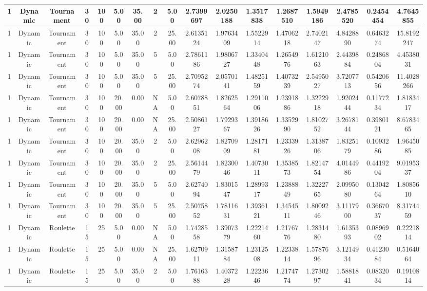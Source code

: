 \begin{longtable}{ | c | c | c | c | c | c | c | c | c | c | c | c | c | c | c | c | c | }
	\hline
	1	&	Dynamic	&	Tournament	&	30	&	100	&	5.00	&	35.00	&	2	&	5.00	&	2.7399697	&	2.0250188	&	1.3517838	&	1.2687510	&	1.5949186	&	2.4785520	&	0.2454454	&	4.7645855 \\
	\hline
	1	&	Dynamic	&	Tournament	&	30	&	100	&	5.00	&	35.00	&	2	&	25.00	&	2.6135124	&	1.9763409	&	1.5522914	&	1.4706218	&	2.7402147	&	4.8428890	&	0.6463274	&	15.8192247 \\
	\hline
	1	&	Dynamic	&	Tournament	&	30	&	100	&	5.00	&	35.00	&	5	&	5.00	&	2.7861186	&	1.9806727	&	1.3340448	&	1.2654976	&	1.6121063	&	2.4439884	&	0.2486804	&	4.4538031 \\
	\hline
	1	&	Dynamic	&	Tournament	&	30	&	100	&	5.00	&	35.00	&	5	&	25.00	&	2.7095274	&	2.0570141	&	1.4825159	&	1.4073239	&	2.5495027	&	3.7207713	&	0.5420656	&	11.4028266 \\
	\hline
	1	&	Dynamic	&	Tournament	&	30	&	100	&	20.00	&	0.00	&	NA	&	5.00	&	2.6078851	&	1.8262564	&	1.2911006	&	1.2391886	&	1.3222918	&	1.9202444	&	0.1177234	&	1.8183417 \\
	\hline
	1	&	Dynamic	&	Tournament	&	30	&	100	&	20.00	&	0.00	&	NA	&	25.00	&	2.5086127	&	1.7929367	&	1.3918626	&	1.3352990	&	1.8102752	&	3.2678144	&	0.3980121	&	8.6783465 \\
	\hline
	1	&	Dynamic	&	Tournament	&	30	&	100	&	20.00	&	35.00	&	2	&	5.00	&	2.6296208	&	1.8270909	&	1.2817181	&	1.2333926	&	1.3138706	&	1.8325179	&	0.1093286	&	1.9645085 \\
	\hline
	1	&	Dynamic	&	Tournament	&	30	&	100	&	20.00	&	35.00	&	2	&	25.00	&	2.5614479	&	1.8230046	&	1.4073011	&	1.3538573	&	1.8214754	&	4.0144986	&	0.4419204	&	9.0195337 \\
	\hline
	1	&	Dynamic	&	Tournament	&	30	&	100	&	20.00	&	35.00	&	5	&	5.00	&	2.6274094	&	1.8301547	&	1.2899317	&	1.2388849	&	1.3222765	&	2.0995080	&	0.1304264	&	1.8085610 \\
	\hline
	1	&	Dynamic	&	Tournament	&	30	&	100	&	20.00	&	35.00	&	5	&	25.00	&	2.5075852	&	1.7811631	&	1.3936121	&	1.3454511	&	1.8009246	&	3.1117900	&	0.3667037	&	8.3174459 \\
	\hline
	1	&	Dynamic	&	Roulette	&	15	&	25	&	5.00	&	0.00	&	NA	&	5.00	&	1.7428558	&	1.3907379	&	1.2221460	&	1.2176776	&	1.2831480	&	1.6135393	&	0.0896902	&	0.2221814 \\
	\hline
	1	&	Dynamic	&	Roulette	&	15	&	25	&	5.00	&	0.00	&	NA	&	25.00	&	1.6270911	&	1.3158784	&	1.2312508	&	1.2233814	&	1.5787696	&	3.1214934	&	0.4123084	&	0.5164064 \\
	\hline
	1	&	Dynamic	&	Roulette	&	15	&	25	&	5.00	&	35.00	&	2	&	5.00	&	1.7616388	&	1.4037228	&	1.2223646	&	1.2174774	&	1.2730297	&	1.5881841	&	0.0832034	&	0.1910814 \\

\end{longtable}
